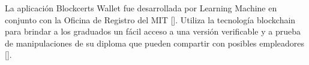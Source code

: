 


La aplicación Blockcerts Wallet fue desarrollada por Learning Machine en conjunto con la Oficina de Registro del MIT [\cite{81}]. Utiliza la tecnología blockchain para brindar a los graduados un fácil acceso a una versión verificable y a prueba de manipulaciones de su diploma que pueden compartir con posibles empleadores [\cite{79}].





